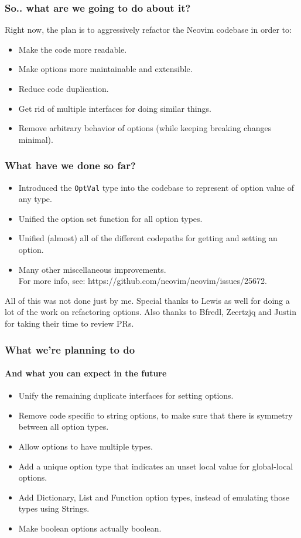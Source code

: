 \documentclass[10pt]{beamer}
\begin{document}
\begin{frame}
\frametitle{So.. what are we going to do about it?}
Right now, the plan is to aggressively refactor the Neovim codebase in order to:
\begin{itemize}
    \item Make the code more readable.
    \item Make options more maintainable and extensible.
    \item Reduce code duplication.
    \item Get rid of multiple interfaces for doing similar things.
    \item Remove arbitrary behavior of options (while keeping breaking changes minimal).
\end{itemize}
\end{frame}
\begin{frame}
\frametitle{What have we done so far?}
\begin{itemize}
    \item Introduced the \lstinline{OptVal} type into the codebase to represent of option value of
    any type.
    \item Unified the option set function for all option types.
    \item Unified (almost) all of the different codepaths for getting and setting an option.
    \item Many other miscellaneous improvements.\\For more info, see:
        https://github.com/neovim/neovim/issues/25672.
\end{itemize}
All of this was not done just by me. Special thanks to Lewis as well for doing a lot of the work on
refactoring options. Also thanks to Bfredl, Zeertzjq and Justin for taking their time to review PRs.
\end{frame}
\begin{frame}
\frametitle{What we're planning to do}
\framesubtitle{And what you can expect in the future}
\begin{itemize}
    \item Unify the remaining duplicate interfaces for setting options.
    \item Remove code specific to string options, to make sure that there is symmetry between all
        option types.
    \item Allow options to have multiple types.
    \item Add a unique option type that indicates an unset local value for global-local options.
    \item Add Dictionary, List and Function option types, instead of emulating those types using
        Strings.
    \item Make boolean options actually boolean.
\end{itemize}
\end{frame}
\end{document}
